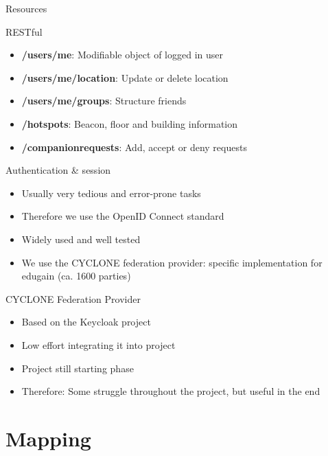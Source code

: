 \documentclass[11pt]{beamer}
\begin{document}
\begin{frame}{Resources}

  RESTful

  \begin{itemize}
    \item \textbf{/users/me}: Modifiable object of logged in user
    \item \textbf{/users/me/location}: Update or delete location
    \item \textbf{/users/me/groups}: Structure friends
    \item \textbf{/hotspots}: Beacon, floor and building information
    \item \textbf{/companionrequests}: Add, accept or deny requests
  \end{itemize}

\end{frame}


\begin{frame}{Authentication \& session}

  \begin{itemize}
    \item Usually very tedious and error-prone tasks
    \item Therefore we use the OpenID Connect standard
    \item Widely used and well tested
    \item We use the CYCLONE federation provider: specific implementation for edugain (ca. 1600 parties)
  \end{itemize}

\end{frame}


\begin{frame}{CYCLONE Federation Provider}

  \begin{itemize}

    \item Based on the Keycloak project
    \item Low effort integrating it into project
    \item Project still starting phase
    \item Therefore: Some struggle throughout the project, but useful in the end

  \end{itemize}

\end{frame}


\section{Mapping}
\end{document}

